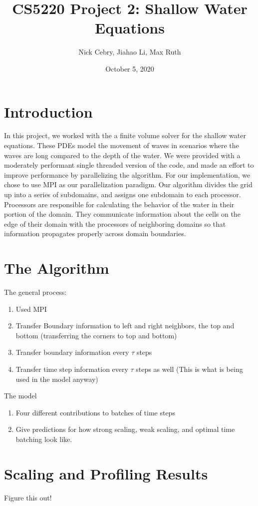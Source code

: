 \documentclass{article}
\title{CS5220 Project 2: Shallow Water Equations}
\author{Nick Cebry, Jiahao Li, Max Ruth}
\date{October 5, 2020}
\begin{document}
\maketitle

\section{Introduction}
In this project, we worked with the a finite volume solver for the shallow
water equations. These PDEs model the movement of waves in scenarios where
the waves are long compared to the depth of the water. We were provided
with a moderately performant single threaded version of the code, and made
an effort to improve performance by parallelizing the algorithm. For our
implementation, we chose to use MPI as our parallelization paradigm. Our
algorithm divides the grid up into a series of subdomains, and assigns one
subdomain to each processor. Processors are responsible for calculating
the behavior of the water in their portion of the domain. They communicate
information about the cells on the edge of their domain with the
processors of neighboring domains so that information propagates properly
across domain boundaries.

\section{The Algorithm}
The general process:
\begin{enumerate}
	\item Used MPI
	\item Transfer Boundary information to left and right neighbors, the top and bottom (transferring the corners to top and bottom)
	\item Transfer boundary information every $\tau$ steps
	\item Transfer time step information every $\tau$ steps as well (This is what is being used in the model anyway)
\end{enumerate}
The model
\begin{enumerate}
	\item Four different contributions to batches of time steps
	\item Give predictions for how strong scaling, weak scaling, and optimal time batching look like.
\end{enumerate}

\section{Scaling and Profiling Results}
Figure this out!
\end{document}
